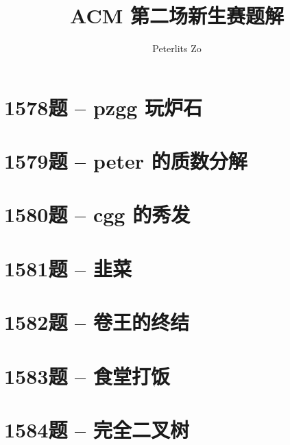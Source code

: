 \documentclass{math}
\title{ACM 第二场新生赛题解}
\author{Peterlits Zo}
\begin{document}
\maketitle
\tableofcontents

\section{1578题 -- pzgg 玩炉石}


\section{1579题 -- peter 的质数分解}


\section{1580题 -- cgg 的秀发}


\section{1581题 -- 韭菜}


\section{1582题 -- 卷王的终结}


\section{1583题 -- 食堂打饭}


\section{1584题 -- 完全二叉树}

\end{document}
